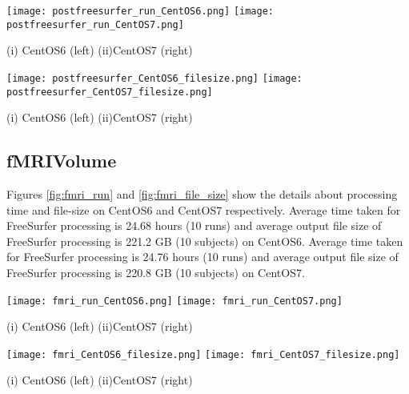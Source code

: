 \begin{center}
\texttt{[image: postfreesurfer\_run\_CentOS6.png]}%
\texttt{[image: postfreesurfer\_run\_CentOS7.png]}
\caption*{(i) CentOS6 (left) (ii)CentOS7 (right)}
\label{fig:postfreesurfer_run}
\end{center}

\begin{center}
\texttt{[image: postfreesurfer\_CentOS6\_filesize.png]}%
\texttt{[image: postfreesurfer\_CentOS7\_filesize.png]}
\caption*{(i) CentOS6 (left) (ii)CentOS7 (right)}
\label{fig:postfreesurfer_file_size}
\end{center}

\subsection{fMRIVolume}
Figures \ref{fig:fmri_run} and \ref{fig:fmri_file_size} show the details about processing time and file-size on CentOS6 and CentOS7 respectively.
Average time taken for FreeSurfer processing is 24.68 hours (10 runs) and average output file size of FreeSurfer processing is 221.2 GB (10 subjects) on CentOS6.
Average time taken for FreeSurfer processing is 24.76 hours (10 runs) and average output file size of FreeSurfer processing is 220.8 GB (10 subjects) on CentOS7.

\begin{center}
\texttt{[image: fmri\_run\_CentOS6.png]}%
\texttt{[image: fmri\_run\_CentOS7.png]}
\caption*{(i) CentOS6 (left) (ii)CentOS7 (right)}
\label{fig:fmri_run}
\end{center}

\begin{center}
\texttt{[image: fmri\_CentOS6\_filesize.png]}%
\texttt{[image: fmri\_CentOS7\_filesize.png]}
\caption*{(i) CentOS6 (left) (ii)CentOS7 (right)}
\label{fig:fmri_file_size}
\end{center}

